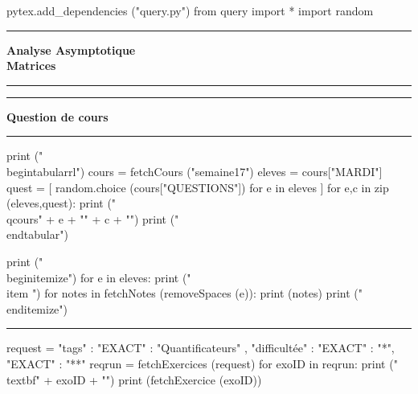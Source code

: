 \documentclass[11pt]{article}
\newcounter{exo}
\newcommand{\qcours}[2]{\textbf{#1} & #2 \\}
\begin{document}
    \begin{pycode}
pytex.add_dependencies ("query.py")
from query import *
import random
    \end{pycode}


\begin{center}
\rule{15em}{2pt}


\vspace{1em}
\textbf{\huge{Analyse Asymptotique \\ Matrices}}
\vspace{0.5em}


\rule{15em}{2pt}
\end{center}



    \begin{center}
        \rule[0.23em]{1.5em}{1pt} 
        \textbf{Question de cours}
        \rule[0.23em]{24em}{1pt}
    \end{center}
    

\begin{center}
\begin{minipage}{0.8\linewidth}
    \begin{pycode}
print ("\\begin{tabular}{rl}")
cours  = fetchCours ("semaine17")
eleves = cours["MARDI"]
quest  = [ random.choice (cours["QUESTIONS"]) for e in eleves ] 
for e,c in zip (eleves,quest):
    print ("\\qcours{" + e + "}{" + c +  "}")
print ("\\end{tabular}")
    \end{pycode}
\end{minipage}
\end{center}

\begin{center}
\begin{minipage}{0.7\linewidth}
        \begin{pycode}
print ("\\begin{itemize}")
for e in eleves:
    print ("\\item ")
    for notes in fetchNotes (removeSpaces (e)):
        print (notes)
print ("\\end{itemize}")
        \end{pycode}
\end{minipage}
\end{center}

    \begin{center}
        \rule{35em}{1pt}
    \end{center}

    \begin{pycode}
request   = {
    "tags" : { 
        "EXACT" : "Quantificateurs"
    },
    "difficultée" : {
        "EXACT" : "*",
        "EXACT" : "**"
    }
}
reqrun    = fetchExercices (request)
for exoID in reqrun:
    print ("\\textbf{" + exoID + "}")
    print (fetchExercice (exoID))
    \end{pycode}
\end{document}
